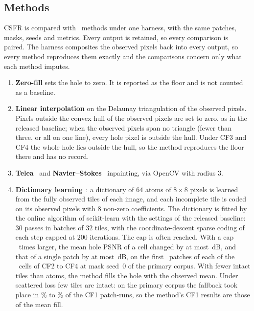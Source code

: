\documentclass[final,3p]{elsarticle}
\begin{document}
\subsection{Methods}
\label{sec:experiments:methods}

CSFR is compared with \methodsTotal\ methods under one harness, with the same patches, masks, seeds and metrics. Every output is retained, so every comparison is paired. The harness composites the observed pixels back into every output, so every method reproduces them exactly and the comparisons concern only what each method imputes.
\begin{enumerate}
  \item \textbf{Zero-fill} sets the hole to zero. It is reported as the floor and is not counted as a baseline.
  \item \textbf{Linear interpolation} on the Delaunay triangulation of the observed pixels. Pixels outside the convex hull of the observed pixels are set to zero, as in the released baseline; when the observed pixels span no triangle (fewer than three, or all on one line), every hole pixel is outside the hull. Under CF3 and CF4 the whole hole lies outside the hull, so the method reproduces the floor there and has no record.
  \item \textbf{Telea}~\cite{telea2004image} and \textbf{Navier--Stokes}~\cite{bertalmio2000image} inpainting, via OpenCV with radius $3$.
  \item \textbf{Dictionary learning}~\cite{mairal2009online,aharon2006ksvd}: a dictionary of $64$ atoms of $8 \times 8$ pixels is learned from the fully observed tiles of each image, and each incomplete tile is coded on its observed pixels with $8$ non-zero coefficients. The dictionary is fitted by the online algorithm of scikit-learn with the settings of the released baseline: $30$ passes in batches of $32$ tiles, with the coordinate-descent sparse coding of each step capped at $200$ iterations. The cap is often reached. With a cap \dictlearnCapFactor\ times larger, the mean hole PSNR of a cell changed by at most \dictlearnCapMaxCellShift\,dB, and that of a single patch by at most \dictlearnCapMaxPatchShift\,dB, on the first \dictlearnCapPatches\ patches of each of the \dictlearnCapCells\ cells of CF2 to CF4 at mask seed~0 of the primary corpus. With fewer intact tiles than atoms, the method fills the hole with the observed mean. Under scattered loss few tiles are intact: on the primary corpus the fallback took place in \fallbackDictCFoneMin\% to \fallbackDictCFoneMax\% of the CF1 patch-runs, so the method's CF1 results are those of the mean fill.

\end{enumerate}
\end{document}
